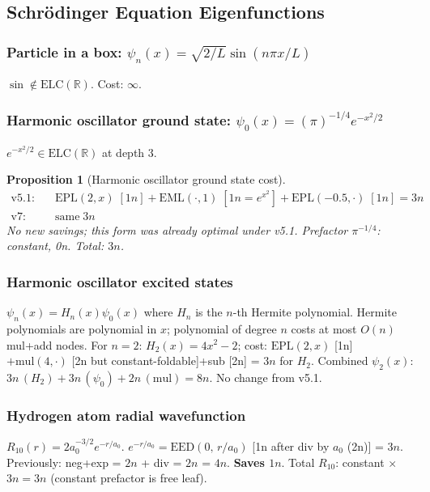 \documentclass[11pt]{article}
\newtheorem{proposition}[theorem]{Proposition}
\begin{document}
\subsection{Schrödinger Equation Eigenfunctions}

\subsubsection{Particle in a box: $\psi_n(x)=\sqrt{2/L}\sin(n\pi x/L)$}

$\sin\notin\mathrm{ELC}(\mathbb{R})$. Cost: $\infty$.

\subsubsection{Harmonic oscillator ground state: $\psi_0(x)=(\pi)^{-1/4}e^{-x^2/2}$}

$e^{-x^2/2}\in\mathrm{ELC}(\mathbb{R})$ at depth 3.

\begin{proposition}[Harmonic oscillator ground state cost]
\begin{align*}
\text{v5.1:} &\quad \mathrm{EPL}(2,x)\;[1n]+\mathrm{EML}(\cdot,1)\;[1n=e^{x^2}]+\mathrm{EPL}(-0.5,\cdot)\;[1n]=3n\\
\text{v7:}   &\quad \text{same}\;3n
\end{align*}
No new savings; this form was already optimal under v5.1.
Prefactor $\pi^{-1/4}$: constant, 0n. Total: $3n$.
\end{proposition}

\subsubsection{Harmonic oscillator excited states}

$\psi_n(x)=H_n(x)\psi_0(x)$ where $H_n$ is the $n$-th Hermite polynomial.
Hermite polynomials are polynomial in $x$; polynomial of degree $n$ costs at most
$O(n)$ mul+add nodes. For $n=2$: $H_2(x)=4x^2-2$; cost: $\mathrm{EPL}(2,x)$ [1n]
$+\mathrm{mul}(4,\cdot)$ [2n but constant-foldable]+sub [2n] = $3n$ for $H_2$.
Combined $\psi_2(x)$: $3n\,(H_2)+3n\,(\psi_0)+2n\,(\mathrm{mul})=8n$. No change from v5.1.

\subsubsection{Hydrogen atom radial wavefunction}

$R_{10}(r)=2a_0^{-3/2}e^{-r/a_0}$.
$e^{-r/a_0}=\mathrm{EED}(0,\,r/a_0)$ [1n after div by $a_0$ (2n)] = $3n$.
Previously: neg+exp = $2n$ + div = $2n$ = $4n$. \textbf{Saves $1n$}.
Total $R_{10}$: constant $\times$ $3n = 3n$ (constant prefactor is free leaf).
\end{document}
